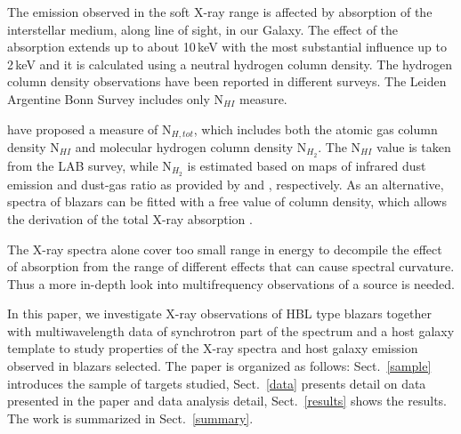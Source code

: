 The emission observed in the soft X-ray range is affected by absorption of the interstellar medium,  along line of sight, in our Galaxy. 
The effect of the absorption  extends up to about 10\,keV with the most substantial influence up to 2\,keV
and it is calculated using a neutral hydrogen column density.
The hydrogen column density observations have been reported in different surveys. 
The  Leiden Argentine Bonn Survey \citep[LAB, ][]{Kalberla2005}  includes only N$_{HI}$ measure. 




\cite{Willingale13} have proposed a  measure of N$_{H,tot}$, which includes both the atomic gas column density N$_{HI}$ and molecular hydrogen column density N$_{H_2}$.
The N$_{HI}$ value is taken from the LAB survey, while  N$_{H_2}$ is estimated based on maps of infrared dust emission and dust-gas ratio as provided by \cite{Schlegel98} and \cite{Dame01}, respectively.
As an alternative, spectra of blazars can be fitted with a free value of column density, which allows  the derivation of the total X-ray absorption \citep[e.g.][]{Furniss2013, Wierzcholska2016, Gaur18}.

The X-ray spectra alone cover too small range in energy to decompile the effect of absorption from the range of different effects that can cause spectral curvature. 
Thus a more in-depth look into multifrequency observations of a source is needed. 


In this paper, we investigate X-ray observations of HBL type blazars together with multiwavelength data  of synchrotron part of the spectrum and a host galaxy template to study properties of the X-ray spectra and host galaxy emission observed in blazars selected. 
The paper is organized as follows: Sect.~\ref{sample} introduces the sample of targets studied, Sect.~\ref{data} presents detail on data presented in the paper and data analysis detail, Sect.~\ref{results} shows the results.
The work is summarized in Sect.~\ref{summary}. 

\noindent

